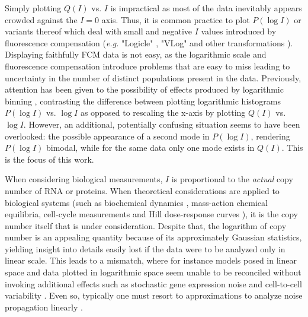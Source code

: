 \documentclass[11pt,a4paper,final]{article}
\begin{document}
\smallskip
Simply plotting $Q(I)$ vs. $I$ is impractical as most of the data inevitably appears crowded against the $I=0$ axis. Thus, it is common practice to plot $P(\log I)$ or variants thereof which deal with small and negative $I$ values introduced by fluorescence compensation ({\it e.g.} "Logicle" \cite{Parks2006}, "VLog" \cite{Bagwell2016} and other transformations \cite{Finak2010}). Displaying faithfully FCM data is not easy, as the logarithmic scale and fluorescence compensation introduce problems that are easy to miss \cite{Herzenberg2006} leading to uncertainty in the number of distinct populations present in the data. Previously, attention has been given to the possibility of effects produced by logarithmic binning \cite{Novo2008}, contrasting the difference between plotting logarithmic histograms $P(\log I)$ vs. $\log I$ as opposed to rescaling the x-axis by plotting $Q(I)$ vs. $\log I$. However, an additional, potentially confusing situation seems to have been overlooked: the possible appearance of a second mode in $P(\log I)$, rendering $P(\log I)$ bimodal, while for the same data only one mode exists in $Q(I)$. This is the focus of this work.
\smallskip

When considering biological measurements, $I$ is proportional to the \emph{actual} copy number of RNA or proteins. When theoretical considerations are applied to biological systems (such as biochemical dynamics \cite{Friedman2006,Prill2015,Pal2015,Ridden2015,Mojtahedi2016,Erez2017}, mass-action chemical equilibria, cell-cycle measurements \cite{Brown2010} and Hill dose-response curves \cite{Prinz2010}), it is the copy number itself that is under consideration. Despite that, the logarithm of copy number is an appealing quantity because of its approximately Gaussian statistics, yielding insight into details easily lost if the data were to be analyzed only in linear scale.  This leads to a mismatch, where for instance models posed in linear space and data plotted in logarithmic space seem unable to be reconciled without invoking additional effects such as stochastic gene expression noise \cite{Friedman2006} and cell-to-cell variability \cite{Feinerman2008,Pelkmans2012,Cotari2013}. Even so, typically one must resort to approximations to analyze noise propagation linearly \cite{Prill2015}.
\smallskip
\end{document}
